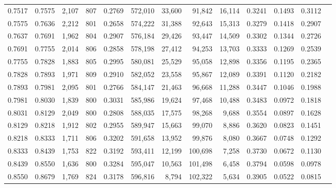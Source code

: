 \begin{tabular}{rrrrrrrrrrrrr}
0.7517 & 0.7575 &  2,107 &   807 &                                     0.2769 & 572,010 &  33,600 &  91,842 &  16,114 & 0.3241 & 0.1493 & 0.3112 \\
0.7575 & 0.7636 &  2,212 &   801 &                                     0.2658 & 574,222 &  31,388 &  92,643 &  15,313 & 0.3279 & 0.1418 & 0.2907 \\
0.7637 & 0.7691 &  1,962 &   804 &                                     0.2907 & 576,184 &  29,426 &  93,447 &  14,509 & 0.3302 & 0.1344 & 0.2726 \\
0.7691 & 0.7755 &  2,014 &   806 &                                     0.2858 & 578,198 &  27,412 &  94,253 &  13,703 & 0.3333 & 0.1269 & 0.2539 \\
0.7755 & 0.7828 &  1,883 &   805 &                                     0.2995 & 580,081 &  25,529 &  95,058 &  12,898 & 0.3356 & 0.1195 & 0.2365 \\
0.7828 & 0.7893 &  1,971 &   809 &                                     0.2910 & 582,052 &  23,558 &  95,867 &  12,089 & 0.3391 & 0.1120 & 0.2182 \\
0.7893 & 0.7981 &  2,095 &   801 &                                     0.2766 & 584,147 &  21,463 &  96,668 &  11,288 & 0.3447 & 0.1046 & 0.1988 \\
0.7981 & 0.8030 &  1,839 &   800 &                                     0.3031 & 585,986 &  19,624 &  97,468 &  10,488 & 0.3483 & 0.0972 & 0.1818 \\
0.8031 & 0.8129 &  2,049 &   800 &                                     0.2808 & 588,035 &  17,575 &  98,268 &   9,688 & 0.3554 & 0.0897 & 0.1628 \\
0.8129 & 0.8218 &  1,912 &   802 &                                     0.2955 & 589,947 &  15,663 &  99,070 &   8,886 & 0.3620 & 0.0823 & 0.1451 \\
0.8218 & 0.8333 &  1,711 &   806 &                                     0.3202 & 591,658 &  13,952 &  99,876 &   8,080 & 0.3667 & 0.0748 & 0.1292 \\
0.8333 & 0.8439 &  1,753 &   822 &                                     0.3192 & 593,411 &  12,199 & 100,698 &   7,258 & 0.3730 & 0.0672 & 0.1130 \\
0.8439 & 0.8550 &  1,636 &   800 &                                     0.3284 & 595,047 &  10,563 & 101,498 &   6,458 & 0.3794 & 0.0598 & 0.0978 \\
0.8550 & 0.8679 &  1,769 &   824 &                                     0.3178 & 596,816 &   8,794 & 102,322 &   5,634 & 0.3905 & 0.0522 & 0.0815 \\

\end{tabular}

